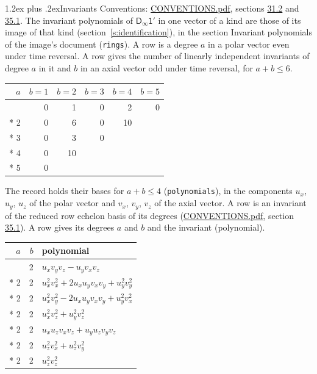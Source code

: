 \documentclass[10pt,a4paper]{article}
\makeatletter
\renewcommand\section{\@startsection{section}{1}{\z@}{-3ex plus -1ex minus -.2ex}%
  {1.2ex plus .2ex}{\normalfont\large\sffamily\bfseries\color{parttitle}}}
\numberwithin{equation}{section}
\newcommand{\grp}[1]{\mathsf{#1}}
\makeatother
\begin{document}
\section{Invariants}\label{s:invariants}
Conventions: \href{../../CONVENTIONS.pdf}{CONVENTIONS.pdf}, sections \href{../../CONVENTIONS.pdf\#conv.31.2}{31.2} and \href{../../CONVENTIONS.pdf\#conv.35.1}{35.1}.
The invariant polynomials of $\grp{D_{\infty}1'}$ in one vector of a kind are those of its image of that kind (section~\ref{s:identification}), in the section Invariant polynomials of the image's document (\texttt{rings}).
\leavevmode\label{n:index.degree.polar}\label{n:index.degree.axial}A row is a degree $a$ in a polar vector even under time reversal. A row gives the number of linearly independent invariants of degree $a$ in it and $b$ in an axial vector odd under time reversal, for $a + b \le 6$.
{\small\begin{longtable}{@{}rrrrrr@{}}\toprule
$a$ & $b = 1$ & $b = 2$ & $b = 3$ & $b = 4$ & $b = 5$\\\midrule\endhead
\bottomrule\endfoot\endlastfoot
1 & 0 & 1 & 0 & 2 & 0\\*
2 & 0 & 6 & 0 & 10 & \\*
3 & 0 & 3 & 0 &  & \\*
4 & 0 & 10 &  &  & \\*
5 & 0 &  &  &  & \\
\bottomrule\end{longtable}}
\leavevmode\label{n:local.component.polar}\label{n:local.component.axial}The record holds their bases for $a + b \le 4$ (\texttt{polynomials}), in the components $u_{x}$, $u_{y}$, $u_{z}$ of the polar vector and $v_{x}$, $v_{y}$, $v_{z}$ of the axial vector. \label{n:head.polynomial}A row is an invariant of the reduced row echelon basis of its degrees (\href{../../CONVENTIONS.pdf}{CONVENTIONS.pdf}, section \href{../../CONVENTIONS.pdf\#conv.35.1}{35.1}). A row gives its degrees $a$ and $b$ and the invariant (polynomial).
{\small\renewcommand{\arraystretch}{1.2}\begin{longtable}{@{}rrl@{}}\toprule
$a$ & $b$ & polynomial\\\midrule\endhead
\bottomrule\endfoot\endlastfoot
1 & 2 & $u_{x}v_{y}v_{z} - u_{y}v_{x}v_{z}$\\*
2 & 2 & $u_{x}^{2}v_{x}^{2} + 2u_{x}u_{y}v_{x}v_{y} + u_{y}^{2}v_{y}^{2}$\\*
2 & 2 & $u_{x}^{2}v_{y}^{2} - 2u_{x}u_{y}v_{x}v_{y} + u_{y}^{2}v_{x}^{2}$\\*
2 & 2 & $u_{x}^{2}v_{z}^{2} + u_{y}^{2}v_{z}^{2}$\\*
2 & 2 & $u_{x}u_{z}v_{x}v_{z} + u_{y}u_{z}v_{y}v_{z}$\\*
2 & 2 & $u_{z}^{2}v_{x}^{2} + u_{z}^{2}v_{y}^{2}$\\*
2 & 2 & $u_{z}^{2}v_{z}^{2}$\\
\bottomrule\end{longtable}}
\end{document}
